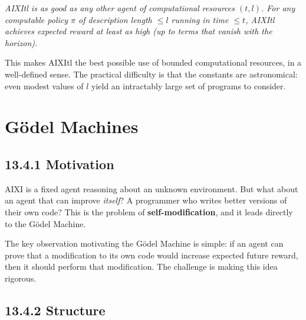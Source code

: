 \begin{theorem}
\textit{AIXItl is as good as any other agent of computational resources $(t, l)$. For any computable policy $\pi$ of description length $\leq l$ running in time $\leq t$, AIXItl achieves expected reward at least as high (up to terms that vanish with the horizon).}

This makes AIXItl the best possible use of bounded computational resources, in a well-defined sense. The practical difficulty is that the constants are astronomical: even modest values of $l$ yield an intractably large set of programs to consider.
\end{theorem}



\section{Gödel Machines}

\subsection{13.4.1 Motivation}

AIXI is a fixed agent reasoning about an unknown environment. But what about an agent that can improve \textit{itself}? A programmer who writes better versions of their own code? This is the problem of \textbf{self-modification}, and it leads directly to the Gödel Machine.

The key observation motivating the Gödel Machine is simple: if an agent can prove that a modification to its own code would increase expected future reward, then it should perform that modification. The challenge is making this idea rigorous.

\subsection{13.4.2 Structure}

